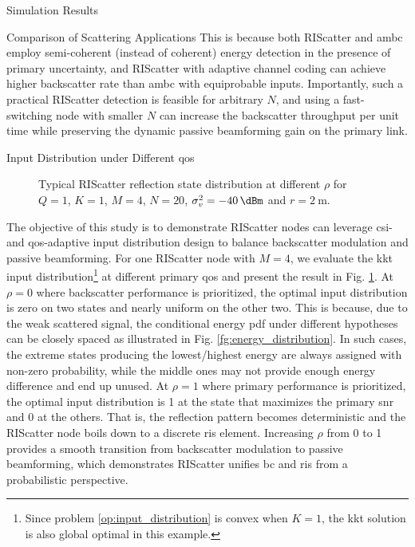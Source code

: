 \documentclass[journal]{IEEEtran}
\begin{document}
\begin{section}{Simulation Results}
\begin{subsection}{Comparison of Scattering Applications}
		This is because both RIScatter and \gls{ambc} employ semi-coherent (instead of coherent) energy detection in the presence of primary uncertainty, and RIScatter with adaptive channel coding can achieve higher backscatter rate than \gls{ambc} with equiprobable inputs.
		Importantly, such a practical RIScatter detection is feasible for arbitrary $N$, and using a fast-switching node with smaller $N$ can increase the backscatter throughput per unit time while preserving the dynamic passive beamforming gain on the primary link.
	\end{subsection}

	\begin{subsection}{Input Distribution under Different \gls{qos}}
		\begin{figure}[!t]
			\centering
			\resizebox{0.65\columnwidth}{!}{
				
			}
			\caption{Typical RIScatter reflection state distribution at different $\rho$ for $Q=1$, $K=1$, $M=4$, $N=20$, $\sigma_v^2=\qty{-40}{\dBm}$ and $r=\qty{2}{\meter}$.}
			\label{fg:distribution_weights}
		\end{figure}
		The objective of this study is to demonstrate RIScatter nodes can leverage \gls{csi}- and \gls{qos}-adaptive input distribution design to balance backscatter modulation and passive beamforming.
		For one RIScatter node with $M=4$, we evaluate the \gls{kkt} input distribution\footnote{Since problem \eqref{op:input_distribution} is convex when $K=1$, the \gls{kkt} solution is also global optimal in this example.} at different primary \gls{qos} and present the result in Fig. \ref{fg:distribution_weights}.
		At $\rho=0$ where backscatter performance is prioritized, the optimal input distribution is zero on two states and nearly uniform on the other two.
		This is because, due to the weak scattered signal, the conditional energy \gls{pdf} under different hypotheses can be closely spaced as illustrated in Fig. \ref{fg:energy_distribution}.
		In such cases, the extreme states producing the lowest/highest energy are always assigned with non-zero probability, while the middle ones may not provide enough energy difference and end up unused.
		At $\rho=1$ where primary performance is prioritized, the optimal input distribution is \num{1} at the state that maximizes the primary \gls{snr} and \num{0} at the others.
		That is, the reflection pattern becomes deterministic and the RIScatter node boils down to a discrete \gls{ris} element.
		Increasing $\rho$ from \num{0} to \num{1} provides a smooth transition from backscatter modulation to passive beamforming, which demonstrates RIScatter unifies \gls{bc} and \gls{ris} from a probabilistic perspective.
	\end{subsection}


\end{section}
\end{document}
